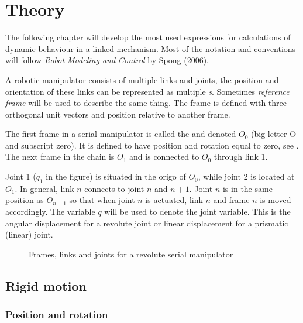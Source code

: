 \vspace{-0.9cm}
\chapter{Theory}\label{secTheory}

\vspace{-0.8cm}

The following chapter will develop the most used expressions for calculations of dynamic behaviour in a linked mechanism. Most of the notation and conventions will follow \textit{Robot Modeling and Control} by Spong (2006). \cite{spong}

A robotic manipulator consists of multiple links and joints, the position and orientation of these links can be represented as multiple \textit{s}. Sometimes \textit{reference frame} will be used to describe the same thing. The frame is defined with three orthogonal unit vectors and position relative to another frame.

The first frame in a serial manipulator is called the  and denoted $O_0$ (big letter O and subscript zero). It is defined to have position and rotation equal to zero, see . The next frame in the chain is $O_1$ and is connected to $O_0$ through link 1.

Joint 1 ($q_1$ in the figure) is situated in the origo of $O_0$, while joint 2 is located at $O_1$. In general, link $n$ connects to joint $n$ and $n+1$. Joint $n$ is in the same position as $O_{n-1}$ so that when joint $n$ is actuated, link $n$ and frame $n$ is moved accordingly. The variable $q$ will be used to denote the joint variable. This is the angular displacement for a revolute joint or linear displacement for a prismatic (linear) joint.

\begin{figure}[h!]    
    \centering           
    \def\svgwidth{.7\columnwidth}
    
    \caption{Frames, links and joints for a revolute serial manipulator}
    \label{frames}
\end{figure}
\restoregeometry


\section{Rigid motion}
\subsection{Position and rotation}

